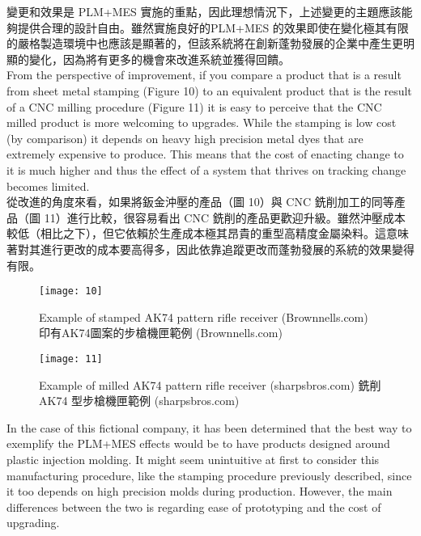\fontsize{14pt}{5pt}\sectionef
 {變更和效果是 PLM+MES 實施的重點，因此理想情況下，上述變更的主題應該能夠提供合理的設計自由。雖然實施良好的PLM+MES 的效果即使在變化極其有限的嚴格製造環境中也應該是顯著的，但該系統將在創新蓬勃發展的企業中產生更明顯的變化，因為將有更多的機會來改進系統並獲得回饋。}\\[15pt]

\fontsize{14pt}{2.5pt}\sectionef 
{From the perspective of improvement, if you compare a product that is a result from sheet metal stamping (Figure 10) to an equivalent product that is the result of a CNC milling procedure (Figure 11) it is easy to perceive that the CNC milled product is more welcoming to upgrades. While the stamping is low cost (by comparison) it depends on heavy high precision metal dyes that are extremely expensive to produce. This means that the cost of enacting change to it is much higher and thus the effect of a system that thrives on tracking change becomes limited.}\\[10pt]

\fontsize{14pt}{5pt}\sectionef
 {從改進的角度來看，如果將鈑金沖壓的產品（圖 10）與 CNC 銑削加工的同等產品（圖 11）進行比較，很容易看出 CNC 銑削的產品更歡迎升級。雖然沖壓成本較低（相比之下），但它依賴於生產成本極其昂貴的重型高精度金屬染料。這意味著對其進行更改的成本要高得多，因此依靠追蹤更改而蓬勃發展的系統的效果變得有限。}\\[15pt]
\newpage

\begin{figure}[hbt!]
\begin{center}
\texttt{[image: 10]}
\caption{\Large Example of stamped AK74 pattern rifle receiver (Brownnells.com) 印有AK74圖案的步槍機匣範例 (Brownnells.com)}\label{fig.10}
\end{center}
\end{figure}

\begin{figure}[hbt!]
\begin{center}
\texttt{[image: 11]}
\caption{\Large Example of milled AK74 pattern rifle receiver (sharpsbros.com) 銑削 AK74 型步槍機匣範例 (sharpsbros.com)}\label{fig.11}
\end{center}
\end{figure}

\fontsize{14pt}{2.5pt}\sectionef 
{In the case of this fictional company, it has been determined that the best way to exemplify the PLM+MES effects would be to have products designed around plastic injection molding. It might seem unintuitive at first to consider this manufacturing procedure, like the stamping procedure previously described, since it too depends on high precision molds during production. However, the main differences between the two is regarding ease of prototyping and the cost of upgrading.}\\[10pt]

